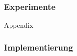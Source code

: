 \appendix
{}
\setcounter{finalframe}{\value{framenumber}}

\begin{frame}[<+->]
\frametitle{Experimente}
    
    Appendix

\end{frame}



\begin{frame}[fragile]
\frametitle{Implementierung}
\cite{openblas}
\cite{armadillo}
\cite{ADOLCmanual}
\cite{boeck14}

\end{frame}

\setcounter{framenumber}{\value{finalframe}}

